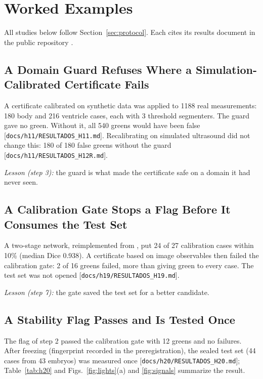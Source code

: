 \documentclass[journal,twoside]{IEEEtran}
\newcommand{\repo}[1]{[\nolinkurl{#1}]}   %
\begin{document}
\section{Worked Examples}\label{sec:examples}
All studies below follow Section~\ref{sec:protocol}. Each cites its results document in the public repository
\cite{repo}.

\subsection{A Domain Guard Refuses Where a Simulation-Calibrated Certificate Fails}\label{sec:exA}
A certificate calibrated on synthetic data was applied to 1188 real measurements: 180 body and 216 ventricle cases,
each with 3 threshold segmenters. The guard gave no green. Without it, all 540 greens would have been false
\repo{docs/h11/RESULTADOS_H11.md}. Recalibrating on simulated ultrasound did not change this: 180 of 180 false
greens without the guard \repo{docs/h11/RESULTADOS_H12R.md}.

\emph{Lesson (step 3):} the guard is what made the certificate safe on a domain it had never seen.

\subsection{A Calibration Gate Stops a Flag Before It Consumes the Test Set}\label{sec:exB}
A two-stage network, reimplemented from \cite{qiu2021,xu2020}, put 24 of 27 calibration cases within 10\% (median
Dice 0.938). A certificate based on image observables then failed the calibration gate: 2 of 16 greens failed, more
than giving green to every case. The test set was not opened \repo{docs/h19/RESULTADOS_H19.md}.

\emph{Lesson (step 7):} the gate saved the test set for a better candidate.

\subsection{A Stability Flag Passes and Is Tested Once}\label{sec:exC}
The flag of step 2 passed the calibration gate with 12 greens and no failures. After freezing (fingerprint recorded
in the preregistration), the sealed test set (44 cases from 43 embryos) was measured once
\repo{docs/h20/RESULTADOS_H20.md}; Table~\ref{tab:h20} and Figs.~\ref{fig:lights}(a) and \ref{fig:signals}
summarize the result.
\end{document}
